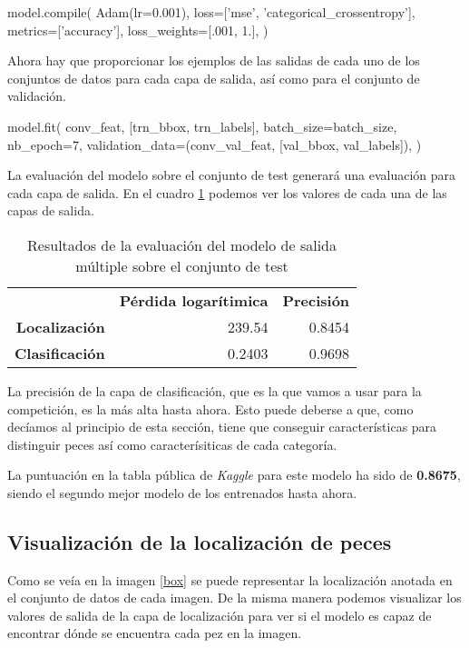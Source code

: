 \begin{python}
model.compile(
    Adam(lr=0.001),
    loss=['mse', 'categorical_crossentropy'],
    metrics=['accuracy'],
    loss_weights=[.001, 1.],
)
\end{python}

Ahora hay que proporcionar los ejemplos de las salidas de cada uno de los
conjuntos de datos para cada capa de salida, así como para el conjunto de
validación.

\begin{python}
model.fit(
    conv_feat,
    [trn_bbox, trn_labels],
    batch_size=batch_size,
    nb_epoch=7,
    validation_data=(conv_val_feat, [val_bbox, val_labels]),
)
\end{python}

La evaluación del modelo sobre el conjunto de test generará una evaluación para
cada capa de salida. En el cuadro \ref{eval_multi} podemos ver los valores de
cada una de las capas de salida.

\begin{table}[]
\centering
\caption{Resultados de la evaluación del modelo de salida múltiple sobre el
conjunto de test}
\label{eval_multi}
\begin{tabular}{rrr}
                       & \textbf{Pérdida logarítimica} & \textbf{Precisión} \\
\textbf{Localización}  & 239.54                        & 0.8454             \\
\textbf{Clasificación} & 0.2403                        & 0.9698            
\end{tabular}
\end{table}

La precisión de la capa de clasificación, que es la que vamos a usar para la
competición, es la más alta hasta ahora. Esto puede deberse a que, como
decíamos al principio de esta sección, tiene que conseguir características para
distinguir peces así como caracterísiticas de cada categoría.

La puntuación en la tabla pública de \textit{Kaggle} para este modelo ha sido
de \textbf{0.8675}, siendo el segundo mejor modelo de los entrenados hasta ahora.

\subsection{Visualización de la localización de peces}

Como se veía en la imagen \ref{box} se puede representar la localización anotada
en el conjunto de datos de cada imagen. De la misma manera podemos visualizar
los valores de salida de la capa de localización para ver si el modelo es capaz
de encontrar dónde se encuentra cada pez en la imagen.

